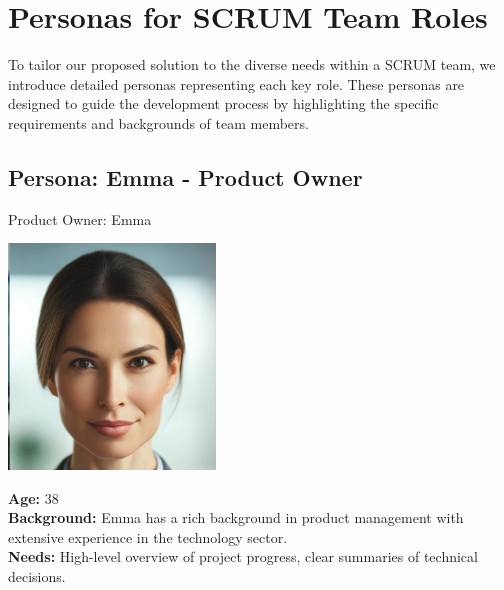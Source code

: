 \section{Personas for SCRUM Team Roles}

To tailor our proposed solution to the diverse needs within a SCRUM team, we introduce detailed personas representing each key role. These personas are designed to guide the development process by highlighting the specific requirements and backgrounds of team members.

\subsection*{Persona: Emma - Product Owner}
\begin{persona}{Product Owner: Emma}
\begin{tcbraster}[raster columns=2, raster column skip=5mm]
  \begin{tcolorbox}[width=0.2\linewidth, colback=white, colframe=white, boxrule=0pt, halign=center]
    \includegraphics[width=\linewidth, height=6cm, keepaspectratio]{Images/Emma.jpg}
  \end{tcolorbox}
  \begin{tcolorbox}[width=0.8\linewidth, colback=white, colframe=white, boxrule=0pt]
    \textbf{Age:} 38\\
    \textbf{Background:} Emma has a rich background in product management with extensive experience in the technology sector.\\
    \textbf{Needs:} High-level overview of project progress, clear summaries of technical decisions.
  \end{tcolorbox}
\end{tcbraster}
\end{persona}


